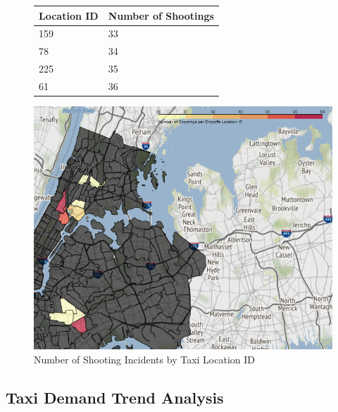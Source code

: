 \documentclass[11pt]{article}
\begin{document}
\begin{figure}[ht]
    \begin{minipage}{0.5\linewidth}
        \centering
        \begin{tabular}{|l|l|}
            \hline
            Location ID & Number of Shootings \\
            \hline\hline
            159 & 33 \\
            78 & 34 \\
            225 & 35 \\
            61 & 36 \\
            \hline
        \end{tabular}
        \label{table1}
    \end{minipage}%
    \begin{minipage}{0.5\linewidth}
        \centering
        \includegraphics[width=\linewidth]{plots/map_shooting_locs.png}
        \caption{Number of Shooting Incidents by Taxi Location ID}
        \label{fig:shooting-map}
    \end{minipage}
\end{figure}

\subsection{Taxi Demand Trend Analysis}
\end{document}
